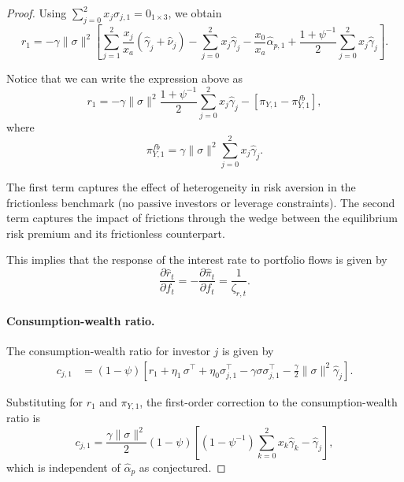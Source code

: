 \begin{proof}
Using $\sum_{j=0}^2 x_{j} \sigma_{j,1} = 0_{1\times 3}$, we obtain
\begin{equation}
    r_1 = 
    - \gamma \|\sigma\|^2 \left[\sum_{j=1}^2 \frac{x_j}{x_a}(\hat{\gamma}_j+ \hat{\nu}_{j})- \sum_{j=0}^2 x_{j} \hat{\gamma}_j  -\frac{x_0}{x_a}\hat{\alpha}_{p,1} +\frac{1+\psi^{-1}}{2} \sum_{j=0}^2 x_{j} \hat{\gamma}_j \right].
\end{equation}

Notice that we can write the expression above as
\begin{equation}
    r_1 = -\gamma \|\sigma\|^2 \frac{1+\psi^{-1}}{2} \sum_{j=0}^2 x_{j} \hat{\gamma}_j - \left[ \pi_{Y,1} - \pi_{Y,1}^{fb}\right],    
\end{equation}
where
\begin{equation}
    \pi_{Y,1}^{fb} = \gamma \|\sigma\|^2 \sum_{j=0}^2 x_{j} \hat{\gamma}_j.
\end{equation}

The first term captures the effect of heterogeneity in risk aversion in the frictionless benchmark (no passive investors or leverage constraints).
The second term captures the impact of frictions through the wedge between the equilibrium risk premium and its frictionless counterpart.

This implies that the response of the interest rate to portfolio flows is given by
\begin{equation}
    \frac{\partial \hat{r}_t}{\partial f_t} = -\frac{\partial \hat{\pi}_t}{\partial f_t} = \frac{1}{\zeta_{r,t}}.
\end{equation}

\paragraph{Consumption-wealth ratio.} The consumption-wealth ratio for investor $j$ is given by
\begin{align}
    c_{j,1} &= (1-\psi) \left[ r_1 + \eta_1\,\sigma^\top + \eta_0 \sigma_{j,1}^\top -\gamma \sigma \sigma_{j,1}^\top - \frac{\gamma}{2} \|\sigma\|^2 \hat{\gamma}_j \right].
\end{align}


Substituting for $r_1$ and $\pi_{Y,1}$, the first-order correction to the consumption-wealth ratio is
\begin{equation}
    c_{j,1} = \frac{\gamma \|\sigma\|^2}{2} (1-\psi)\left[ \left(1-\psi^{-1}\right) \sum_{k=0}^2 x_k\hat{\gamma}_k-\hat{\gamma}_j\right],
\end{equation}
which is independent of $\hat{\alpha}_p$ as conjectured.


\end{proof}
